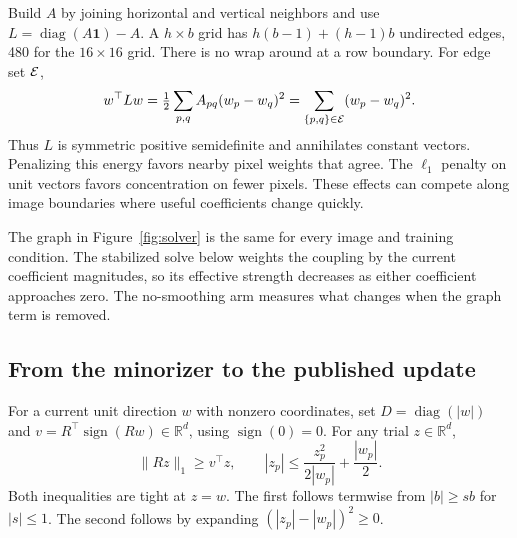Build $A$ by joining horizontal and vertical neighbors and use $L=\operatorname{diag}(A\mathbf1)-A$. A $h\times b$ grid has $h(b-1)+(h-1)b$ undirected edges, 480 for the $16\times16$ grid. There is no wrap around at a row boundary. For edge set $\mathcal{E}$,
\begin{equation}
 w^\top Lw=\tfrac{1}{2}\sum_{p,q}A_{pq}(w_p-w_q)^2
           =\sum_{\{p,q\}\in\mathcal{E}}(w_p-w_q)^2 .
 \label{eq:energy}
\end{equation}
Thus $L$ is symmetric positive semidefinite and annihilates constant vectors. Penalizing this energy favors nearby pixel weights that agree. The $\ell_1$ penalty on unit vectors favors concentration on fewer pixels. These effects can compete along image boundaries where useful coefficients change quickly.

The graph in Figure~\ref{fig:solver} is the same for every image and training condition. The stabilized solve below weights the coupling by the current coefficient magnitudes, so its effective strength decreases as either coefficient approaches zero. The no-smoothing arm measures what changes when the graph term is removed.

\clearpage
\subsection{From the minorizer to the published update}

For a current unit direction $w$ with nonzero coordinates, set $D=\operatorname{diag}(|w|)$ and $v=R^\top\operatorname{sign}(Rw)\in\mathbb R^d$, using $\operatorname{sign}(0)=0$. For any trial $z\in\mathbb R^d$,
\[
 \|Rz\|_1\ge v^\top z,\qquad
 |z_p|\le\frac{z_p^2}{2|w_p|}+\frac{|w_p|}{2}.
\]
Both inequalities are tight at $z=w$. The first follows termwise from $|b|\ge s b$ for $|s|\le1$. The second follows by expanding $(|z_p|-|w_p|)^2\ge0$.


